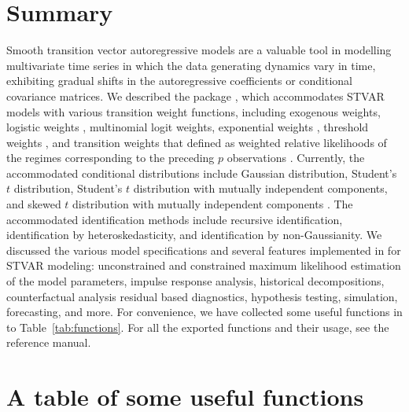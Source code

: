 \documentclass[nojss]{jss}
\begin{document}
\section{Summary}\label{sec:summary}

Smooth transition vector autoregressive models are a valuable tool in modelling multivariate time series in which the data generating dynamics vary in time, exhibiting gradual shifts in the autoregressive coefficients or conditional covariance matrices. We described the  package , which accommodates STVAR models with various transition weight functions, including exogenous weights, logistic weights \citep{Anderson+Vahid:1998}, multinomial logit weights, exponential weights \citep[e.g.,][]{Hubrich+Terasvirta:2013}, threshold weights \citep{Tsay:1998}, and transition weights that defined as weighted relative likelihoods of the regimes corresponding to the preceding $p$ observations \citep{Lanne+Virolainen:2024}. Currently, the accommodated conditional distributions include Gaussian distribution, Student's $t$ distribution, Student's $t$ distribution with mutually independent components, and skewed $t$ distribution with mutually independent components \citep[see][]{Hansen:1994}. The accommodated identification methods include recursive identification, identification by heteroskedasticity, and identification by non-Gaussianity. We discussed the various model specifications and several features implemented in  for STVAR modeling: unconstrained and constrained maximum likelihood estimation of the model parameters, impulse response analysis, historical decompositions, counterfactual analysis residual based diagnostics, hypothesis testing, simulation, forecasting, and more. For convenience, we have collected some useful functions in  to Table~\ref{tab:functions}. For all the exported functions and their usage, see the reference manual.


\clearpage
\section*{A table of some useful functions}\label{sec:table}
\end{document}
